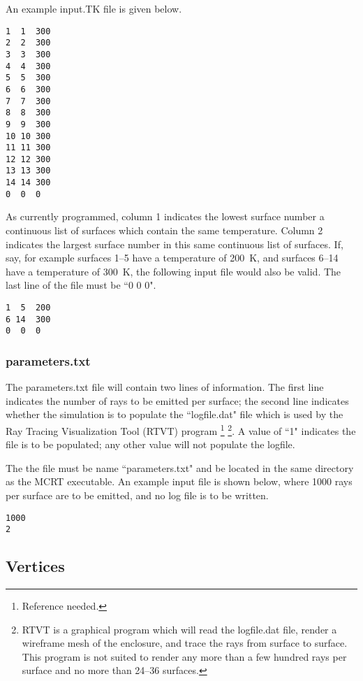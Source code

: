 \documentclass{article}
\begin{document}
An example input.TK file is given below.

\begin{lstlisting}
1  1  300
2  2  300
3  3  300
4  4  300
5  5  300
6  6  300
7  7  300
8  8  300
9  9  300
10 10 300
11 11 300
12 12 300
13 13 300
14 14 300
0  0  0
\end{lstlisting}

As currently programmed, column 1 indicates the lowest surface number a continuous list of surfaces which contain the same temperature. Column 2 indicates the largest surface number in this same continuous list of surfaces. If, say, for example surfaces 1--5 have a temperature of \SI{200}{\kelvin}, and surfaces 6--14 have a temperature of \SI{300}{\kelvin}, the following input file would also be valid. The last line of the file must be ``0 0 0".

\begin{lstlisting}
1  5  200
6 14  300
0  0  0
\end{lstlisting}

\subsubsection{parameters.txt}

The parameters.txt file will contain two lines of information. The first line indicates the number of rays to be emitted per surface; the second line indicates whether the simulation is to populate the ``logfile.dat" file which is used by the Ray Tracing Visualization Tool (RTVT) program \footnote{Reference needed.} \footnote{RTVT is a graphical program which will read the logfile.dat file, render a wireframe mesh of the enclosure, and trace the rays from surface to surface. This program is not suited to render any more than a few hundred rays per surface and no more than 24--36 surfaces.}. A value of ``1" indicates the file is to be populated; any other value will not populate the logfile.

The the file must be name ``parameters.txt" and be located in the same directory as the MCRT executable. An example input file is shown below, where 1000 rays per surface are to be emitted, and no log file is to be written.

\begin{lstlisting}
1000
2
\end{lstlisting}

\subsection{Vertices}
\label{subsec:verts}
\end{document}
